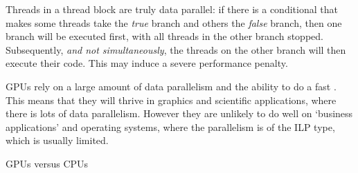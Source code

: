 Threads in a thread block are truly data parallel: if there is a
conditional that makes some threads take the \emph{true} branch and
others the \emph{false} branch, then one branch will be executed
first, with all threads in the other branch stopped. Subsequently,
\emph{and not simultaneously}, the threads on the other branch will
then execute their code. This may induce a severe performance penalty.

\acp{GPU} rely on a large amount of data parallelism and the ability to
do a fast
. This means that they will thrive in
graphics and scientific applications, where there is lots of data
parallelism. However they are unlikely to do well on `business
applications' and operating systems, where the parallelism is of the
\acf{ILP} type, which is usually limited.

 {GPUs versus CPUs}

